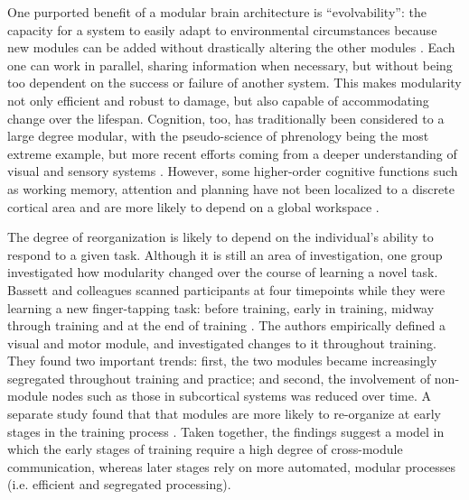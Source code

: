 One purported benefit of a modular brain architecture is ``evolvability'': the capacity for a system to easily adapt to environmental circumstances because new modules can be added without drastically altering the other modules \citep{Kashtan2005}. Each one can work in parallel, sharing information when necessary, but without being too dependent on the success or failure of another system. This makes modularity not only efficient and robust to damage, but also capable of accommodating change over the lifespan. Cognition, too, has traditionally been considered to a large degree modular, with the pseudo-science of phrenology being the most extreme example, but more recent efforts coming from a deeper understanding of visual and sensory systems \citep{Barrett2006}. However, some higher-order cognitive functions such as working memory, attention and planning have not been localized to a discrete cortical area and are more likely to depend on a global workspace \citep{Dehaene1998}.

The degree of reorganization is likely to depend on the individual's ability to respond to a given task. Although it is still an area of investigation, one group investigated how modularity changed over the course of learning a novel task. Bassett and colleagues scanned participants at four timepoints while they were learning a new finger-tapping task: before training, early in training, midway through training and at the end of training \citep{Bassett2015}. The authors empirically defined a visual and motor module, and investigated changes to it throughout training. They found two important trends: first, the two modules became increasingly segregated throughout training and practice; and second, the involvement of non-module nodes such as those in subcortical systems was reduced over time. A separate study found that that modules are more likely to re-organize at early stages in the training process \citep{Bassett2010}. Taken together, the findings suggest a model in which the early stages of training require a high degree of cross-module communication, whereas later stages rely on more automated, modular processes (i.e. efficient and segregated processing). 

